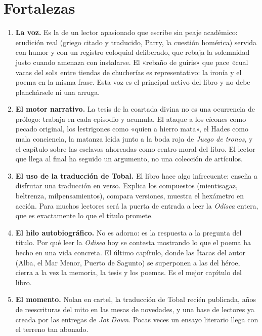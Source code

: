 \documentclass[12pt,a4paper]{article}
\begin{document}
\section*{Fortalezas}

\begin{enumerate}
  \item \textbf{La voz.} Es la de un lector apasionado que escribe sin peaje académico: erudición real (griego citado y traducido, Parry, la cuestión homérica) servida con humor y con un registro coloquial deliberado, que rebaja la solemnidad justo cuando amenaza con instalarse. El «rebaño de guiris» que pace «cual vacas del sol» entre tiendas de chucherías es representativo: la ironía y el poema en la misma frase. Esta voz es el principal activo del libro y no debe planchársele ni una arruga.
  \item \textbf{El motor narrativo.} La tesis de la coartada divina no es una ocurrencia de prólogo: trabaja en cada episodio y acumula. El ataque a los cícones como pecado original, los lestrigones como «quien a hierro mata», el Hades como mala conciencia, la matanza leída junto a la boda roja de \emph{Juego de tronos}, y el capítulo sobre las esclavas ahorcadas como centro moral del libro. El lector que llega al final ha seguido un argumento, no una colección de artículos.
  \item \textbf{El uso de la traducción de Tobal.} El libro hace algo infrecuente: enseña a disfrutar una traducción en verso. Explica los compuestos (mientisagaz, beltrenza, milpensamientos), compara versiones, muestra el hexámetro en acción. Para muchos lectores será la puerta de entrada a leer la \emph{Odisea} entera, que es exactamente lo que el título promete.
  \item \textbf{El hilo autobiográfico.} No es adorno: es la respuesta a la pregunta del título. Por qué leer la \emph{Odisea} hoy se contesta mostrando lo que el poema ha hecho en una vida concreta. El último capítulo, donde las Ítacas del autor (Alba, el Mar Menor, Puerto de Sagunto) se superponen a las del héroe, cierra a la vez la memoria, la tesis y los poemas. Es el mejor capítulo del libro.
  \item \textbf{El momento.} Nolan en cartel, la traducción de Tobal recién publicada, años de reescrituras del mito en las mesas de novedades, y una base de lectores ya creada por las entregas de \emph{Jot Down}. Pocas veces un ensayo literario llega con el terreno tan abonado.
\end{enumerate}
\end{document}
